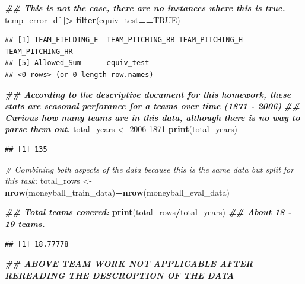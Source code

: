 \documentclass[
]{article}
\newenvironment{Shaded}{\begin{snugshade}}{\end{snugshade}}
\newcommand{\CommentTok}[1]{\textcolor[rgb]{0.56,0.35,0.01}{\textit{#1}}}
\newcommand{\ConstantTok}[1]{\textcolor[rgb]{0.56,0.35,0.01}{#1}}
\newcommand{\DecValTok}[1]{\textcolor[rgb]{0.00,0.00,0.81}{#1}}
\newcommand{\DocumentationTok}[1]{\textcolor[rgb]{0.56,0.35,0.01}{\textbf{\textit{#1}}}}
\newcommand{\FunctionTok}[1]{\textcolor[rgb]{0.13,0.29,0.53}{\textbf{#1}}}
\newcommand{\NormalTok}[1]{#1}
\newcommand{\OtherTok}[1]{\textcolor[rgb]{0.56,0.35,0.01}{#1}}
\newcommand{\SpecialCharTok}[1]{\textcolor[rgb]{0.81,0.36,0.00}{\textbf{#1}}}
\begin{document}
\begin{Shaded}
\begin{Highlighting}[]
\DocumentationTok{\#\# This is not the case, there are no instances where this is true.       }
\NormalTok{temp\_error\_df }\SpecialCharTok{|\textgreater{}} 
  \FunctionTok{filter}\NormalTok{(equiv\_test}\SpecialCharTok{==}\ConstantTok{TRUE}\NormalTok{)}
\end{Highlighting}
\end{Shaded}

\begin{verbatim}
## [1] TEAM_FIELDING_E  TEAM_PITCHING_BB TEAM_PITCHING_H  TEAM_PITCHING_HR
## [5] Allowed_Sum      equiv_test      
## <0 rows> (or 0-length row.names)
\end{verbatim}

\begin{Shaded}
\begin{Highlighting}[]
\DocumentationTok{\#\# According to the descriptive document for this homework, these stats are seasonal perforance for a teams over time (1871 {-} 2006)}
\DocumentationTok{\#\# Curious how many teams are in this data, although there is no way to parse them out. }
\NormalTok{total\_years }\OtherTok{\textless{}{-}} \DecValTok{2006{-}1871}
\FunctionTok{print}\NormalTok{(total\_years)}
\end{Highlighting}
\end{Shaded}

\begin{verbatim}
## [1] 135
\end{verbatim}

\begin{Shaded}
\begin{Highlighting}[]
\CommentTok{\# Combining both aspects of the data because this is the same data but split for this task: }
\NormalTok{total\_rows }\OtherTok{\textless{}{-}} \FunctionTok{nrow}\NormalTok{(moneyball\_train\_data)}\SpecialCharTok{+}\FunctionTok{nrow}\NormalTok{(moneyball\_eval\_data)}

\DocumentationTok{\#\# Total teams covered: }
\FunctionTok{print}\NormalTok{(total\_rows}\SpecialCharTok{/}\NormalTok{total\_years) }\DocumentationTok{\#\# About 18 {-} 19 teams. }
\end{Highlighting}
\end{Shaded}

\begin{verbatim}
## [1] 18.77778
\end{verbatim}

\begin{Shaded}
\begin{Highlighting}[]
\DocumentationTok{\#\# ABOVE TEAM WORK NOT APPLICABLE AFTER REREADING THE DESCROPTION OF THE DATA }
\end{Highlighting}
\end{Shaded}
\end{document}
